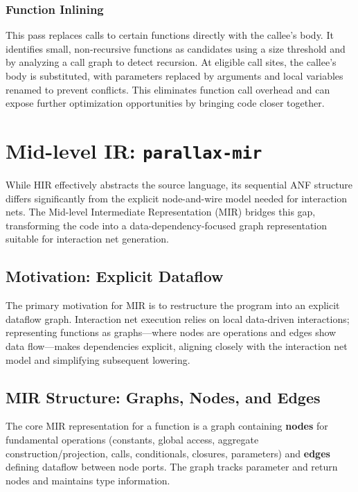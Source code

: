 \subsubsection{Function Inlining}
This pass replaces calls to certain functions directly with the callee's body. It identifies small, non-recursive functions as candidates using a size threshold and by analyzing a call graph to detect recursion. At eligible call sites, the callee's body is substituted, with parameters replaced by arguments and local variables renamed to prevent conflicts. This eliminates function call overhead and can expose further optimization opportunities by bringing code closer together.

\section{Mid-level IR: \texttt{parallax-mir}}

While HIR effectively abstracts the source language, its sequential ANF structure differs significantly from the explicit node-and-wire model needed for interaction nets. The Mid-level Intermediate Representation (MIR) bridges this gap, transforming the code into a data-dependency-focused graph representation suitable for interaction net generation.

\subsection{Motivation: Explicit Dataflow}

The primary motivation for MIR is to restructure the program into an explicit dataflow graph. Interaction net execution relies on local data-driven interactions; representing functions as graphs—where nodes are operations and edges show data flow—makes dependencies explicit, aligning closely with the interaction net model and simplifying subsequent lowering.

\subsection{MIR Structure: Graphs, Nodes, and Edges}

The core MIR representation for a function is a graph containing \textbf{nodes} for fundamental operations (constants, global access, aggregate construction/projection, calls, conditionals, closures, parameters) and \textbf{edges} defining dataflow between node ports. The graph tracks parameter and return nodes and maintains type information.

